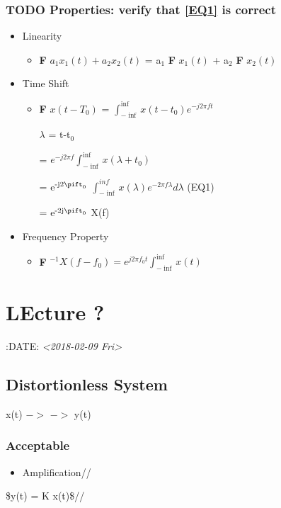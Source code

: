 \documentclass[11pt]{article}
\begin{document}
\subsubsection{{\bfseries\sffamily TODO} Properties: verify that \ref{EQ1} is correct}
\label{sec-1-4-1}
\begin{itemize}
\item Linearity
\begin{itemize}
\item \textbf{F} ${a_1 x_1(t) + a_2 x_2(t)}$ = a$_{\text{1}}$ \textbf{F} ${x_1(t)}$ + a$_{\text{2}}$ \textbf{F} ${x_2(t)}$
\end{itemize}
\item Time Shift
\begin{itemize}
\item \textbf{F} ${x(t - T_0)}$ = $\int_{-\inf}^{\inf} x(t-t_0) e^{-j2\pi ft}$

$\lambda$ = t-t$_{\text{0}}$

= $e^{-j2\pi f}\int_{-\inf}^{\inf}{x(\lambda +t_0)}$

= e$^{\text{-j2}\pift_{\text{0}}}$ $\int_{-\inf}^{inf} x(\lambda) e^{-2\pi f\lambda} d\lambda$ \label{EQ1} (EQ1)

= e$^{\text{-2j}\pift_{\text{0}}}$ X(f)
\end{itemize}

\item Frequency Property
\begin{itemize}
\item \textbf{F} $^{-1}{X(f-f_0)} = e^{j2\pi f_0t} \int_{-\inf}^{\inf}{x(t)}$
\end{itemize}
\end{itemize}

\section{LEcture ?}
\label{sec-2}
:DATE: \textit{<2018-02-09 Fri>}

\subsection{Distortionless System}
\label{sec-2-1}

x(t) $->$ \box $->$ y(t)

\subsubsection{Acceptable}
\label{sec-2-1-1}
\begin{itemize}
\item Amplification//
\end{itemize}
\$y(t) = K x(t)\$//
\end{document}

